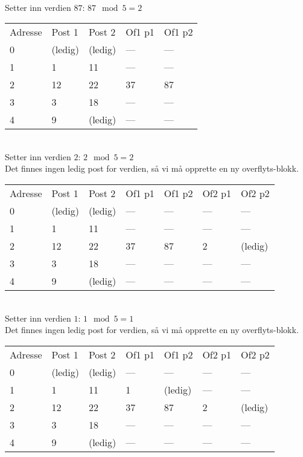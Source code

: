 \documentclass[a4paper, 12pt] {article}
\begin{document}
~\\
Setter inn verdien $87$: $87 \mod 5 = 2$\\
\begin{tabular}{|l|l|l|l|l|}
    \hline
    Adresse & Post 1 & Post 2 & Of1 p1 & Of1 p2 \\
    0       & (ledig)& (ledig)& ---   & ---   \\
    1       & 1      & 11     & ---   & ---   \\
    2       & 12     & 22     & 37     & 87     \\
    3       & 3      & 18     & ---   & ---   \\
    4       & 9      & (ledig)& ---   & ---   \\ \hline
\end{tabular}

~\\
Setter inn verdien $2$: $2 \mod 5 = 2$\\
Det finnes ingen ledig post for verdien, så vi må opprette en ny overflyts-blokk.\\
\begin{tabular}{|l|l|l|l|l|l|l|}
    \hline
    Adresse & Post 1 & Post 2 & Of1 p1 & Of1 p2 & Of2 p1 & Of2 p2 \\
    0       & (ledig)& (ledig)& ---   & ---   & ---   & ---   \\
    1       & 1      & 11     & ---   & ---   & ---   & ---   \\
    2       & 12     & 22     & 37     & 87     & 2      & (ledig)\\
    3       & 3      & 18     & ---   & ---   & ---   & ---   \\
    4       & 9      & (ledig)& ---   & ---   & ---   & ---   \\ \hline
\end{tabular}

~\\
Setter inn verdien $1$: $1 \mod 5 = 1$\\
Det finnes ingen ledig post for verdien, så vi må opprette en ny overflyts-blokk.\\
\begin{tabular}{|l|l|l|l|l|l|l|}
    \hline
    Adresse & Post 1 & Post 2 & Of1 p1 & Of1 p2 & Of2 p1 & Of2 p2 \\
    0       & (ledig)& (ledig)& ---   & ---   & ---   & ---   \\
    1       & 1      & 11     & 1      & (ledig)& ---   & ---   \\
    2       & 12     & 22     & 37     & 87     & 2      & (ledig)\\
    3       & 3      & 18     & ---   & ---   & ---   & ---   \\
    4       & 9      & (ledig)& ---   & ---   & ---   & ---   \\ \hline
\end{tabular}
\end{document}
